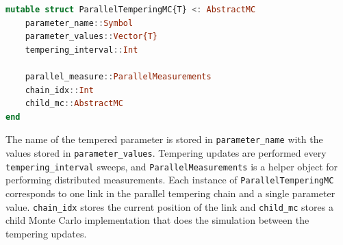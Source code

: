 \documentclass{SciPost}
\begin{document}
\begin{lstlisting}[language=julia]
mutable struct ParallelTemperingMC{T} <: AbstractMC
    parameter_name::Symbol
    parameter_values::Vector{T}
    tempering_interval::Int

    parallel_measure::ParallelMeasurements
    chain_idx::Int
    child_mc::AbstractMC
end
\end{lstlisting}
The name of the tempered parameter is stored in \texttt{parameter\_{}name} with the values stored in \texttt{parameter\_{}values}. Tempering updates are performed every \texttt{tempering\_{}interval} sweeps, and \texttt{ParallelMeasurements} is a helper object for performing distributed measurements. Each instance of \texttt{ParallelTemperingMC} corresponds to one link in the parallel tempering chain and a single parameter value. \texttt{chain\_{}idx} stores the current position of the link and \texttt{child\_{}mc} stores a child Monte Carlo implementation that does the simulation between the tempering updates.
\end{document}
